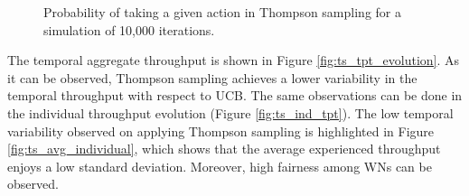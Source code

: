 \documentclass[preprint,12pt]{elsarticle}
\begin{document}
\begin{figure}[t!]
	\centering							
	\caption{Probability of taking a given action in Thompson sampling for a simulation of 10,000 iterations.}
	\label{fig:actions_probability_ts}
\end{figure}		

The temporal aggregate throughput is shown in Figure \ref{fig:ts_tpt_evolution}. As it can be observed, Thompson sampling achieves a lower variability in the temporal throughput with respect to UCB. The same observations can be done in the individual throughput evolution (Figure \ref{fig:ts_ind_tpt}). The low temporal variability observed on applying Thompson sampling is highlighted in Figure \ref{fig:ts_avg_individual}, which shows that the average experienced throughput enjoys a low standard deviation. Moreover, high fairness among WNs can be observed.
\end{document}
